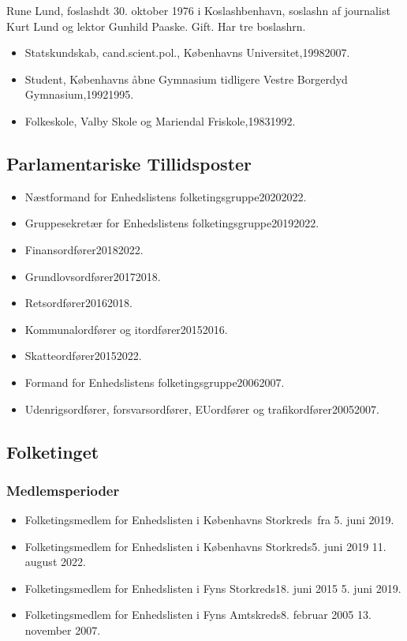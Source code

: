\documentclass[11pt, a4paper]{awesome-cv}
\begin{document}
\makecvheader[R]
\makelettertitle
\begin{cvletter}
Rune Lund, foslashdt 30. oktober 1976 i Koslashbenhavn, soslashn af journalist Kurt Lund og lektor Gunhild Paaske. Gift. Har tre boslashrn.

\begin{itemize}
\item Statskundskab, cand.scient.pol., Københavns Universitet,19982007.
\item Student, Københavns åbne Gymnasium tidligere Vestre Borgerdyd Gymnasium,19921995.
\item Folkeskole, Valby Skole og Mariendal Friskole,19831992.
\end{itemize}
\subsection*{Parlamentariske Tillidsposter}
\begin{itemize}
\item Næstformand for Enhedslistens folketingsgruppe20202022.
\item Gruppesekretær for Enhedslistens folketingsgruppe20192022.
\item Finansordfører20182022.
\item Grundlovsordfører20172018.
\item Retsordfører20162018.
\item Kommunalordfører og itordfører20152016.
\item Skatteordfører20152022.
\item Formand for Enhedslistens folketingsgruppe20062007.
\item Udenrigsordfører, forsvarsordfører, EUordfører og trafikordfører20052007.
\end{itemize}
\subsection*{Folketinget}
\subsubsection*{Medlemsperioder}
\begin{itemize}
\item Folketingsmedlem for Enhedslisten i Københavns Storkreds fra 5. juni 2019.
\item Folketingsmedlem for Enhedslisten i Københavns Storkreds5. juni 2019  11. august 2022.
\item Folketingsmedlem for Enhedslisten i Fyns Storkreds18. juni 2015  5. juni 2019.
\item Folketingsmedlem for Enhedslisten i Fyns Amtskreds8. februar 2005  13. november 2007.
\end{itemize}

\end{cvletter}
\end{document}
